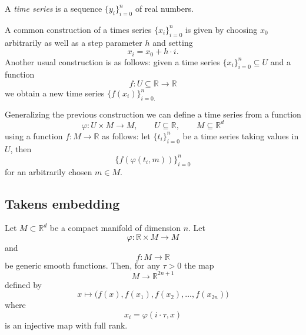 \documentclass{amsart}
\begin{document}
	A \textit{time series} is a sequence $\{y_i\}_{i = 0}^n$ of real numbers. 
	
	A common construction of a times series $\{x_i\}_{i = 0}^n$ is given by choosing $x_0$ arbitrarily as well as a step parameter $h$ and setting
	\begin{equation*}
	x_i = x_0 + h\cdot i.
	\end{equation*}
	Another usual construction is as follows: given a time series $\{x_i\}_{i = 0}^n \subseteq U$ and a function
	\begin{equation*}
	f : U \subseteq \mathbb R \to \mathbb R
	\end{equation*}
	we obtain a new time series $\{f(x_i)\}_{i = 0.}^n$
	
	Generalizing the previous construction we can define a time series from a function 
	\begin{equation*}
	\varphi : U \times M \to M, \qquad U \subseteq \mathbb R, \qquad M \subseteq \mathbb R^d
	\end{equation*} 
	using a function $f : M \to \mathbb R$ as follows: let $\{t_i\}_{i=0}^n$ be a time series taking values in $U$, then
	\begin{equation*}
	\{f(\varphi(t_i, m))\}_{i=0}^n
	\end{equation*}
	for an arbitrarily chosen $m \in M$.
	
	\subsection*{Takens embedding}	\label{takens_embedding}
	
	Let $M \subset \mathbb R^d$ be a 
	compact manifold of dimension $n$. Let
	\begin{equation*}
	\varphi : \mathbb R \times M \to M
	\end{equation*} 
	and
	\begin{equation*}
	f : M \to \mathbb R
	\end{equation*}
	be generic smooth functions. Then, for any $\tau > 0$ the map
	\begin{equation*}
	M \to \mathbb R^{2n+1}
	\end{equation*}
	defined by
	\begin{equation*}
	x \mapsto\big( f(x), f(x_1), f(x_2), \dots, f(x_{2n}) \big)
	\end{equation*}
	where 
	\begin{equation*}
	x_i = \varphi(i \cdot \tau, x)
	\end{equation*}
	is an injective map with full rank.
	
\end{document}
